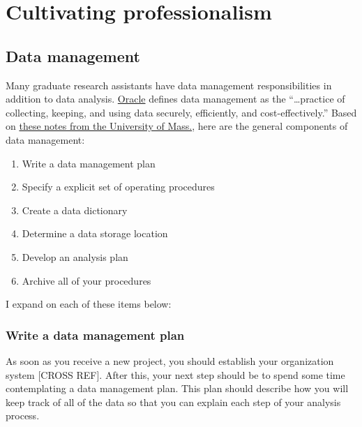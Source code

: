 \documentclass[
]{book}
\begin{document}
\hypertarget{cultivating-professionalism}{%
\chapter{Cultivating professionalism}\label{cultivating-professionalism}}

\hypertarget{data-management}{%
\section{Data management}\label{data-management}}

Many graduate research assistants have data management responsibilities in addition to data analysis. \href{https://www.oracle.com/database/what-is-data-management/}{Oracle} defines data management as the ``\ldots practice of collecting, keeping, and using data securely, efficiently, and cost-effectively.'' Based on \href{https://people.umass.edu/biostat690c/pdf/1.\%20\%20Principles\%20of\%20Data\%20Management\%202020.pdf}{these notes from the University of Mass.}, here are the general components of data management:

\begin{enumerate}
\def\labelenumi{\arabic{enumi}.}
\item
  Write a data management plan
\item
  Specify a explicit set of operating procedures
\item
  Create a data dictionary
\item
  Determine a data storage location
\item
  Develop an analysis plan
\item
  Archive all of your procedures
\end{enumerate}

I expand on each of these items below:

\hypertarget{write-a-data-management-plan}{%
\subsection{Write a data management plan}\label{write-a-data-management-plan}}

As soon as you receive a new project, you should establish your organization system {[}CROSS REF{]}. After this, your next step should be to spend some time contemplating a data management plan. This plan should describe how you will keep track of all of the data so that you can explain each step of your analysis process.
\end{document}
